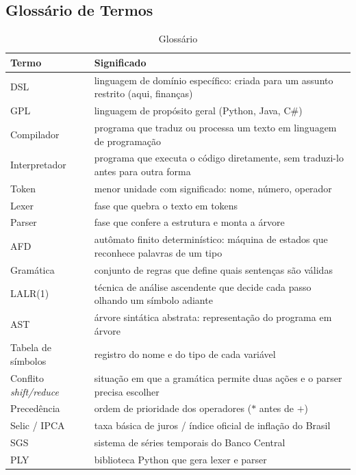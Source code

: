 \documentclass[conference]{IEEEtran}
\begin{document}
\subsection{Glossário de Termos}
\label{sec:glossario}

\begin{table}[!htbp]
\caption{Glossário}
\label{tab:glossario}
\centering
\footnotesize
\begin{tabular}{@{}p{}p{}@{}}
\toprule
\textbf{Termo} & \textbf{Significado} \\
\midrule
DSL & linguagem de domínio específico: criada para um assunto restrito (aqui, finanças) \\
GPL & linguagem de propósito geral (Python, Java, C\#) \\
Compilador & programa que traduz ou processa um texto em linguagem de programação \\
Interpretador & programa que executa o código diretamente, sem traduzi-lo antes para outra forma \\
Token & menor unidade com significado: nome, número, operador \\
Lexer & fase que quebra o texto em tokens \\
Parser & fase que confere a estrutura e monta a árvore \\
AFD & autômato finito determinístico: máquina de estados que reconhece palavras de um tipo \\
Gramática & conjunto de regras que define quais sentenças são válidas \\
LALR(1) & técnica de análise ascendente que decide cada passo olhando um símbolo adiante \\
AST & árvore sintática abstrata: representação do programa em árvore \\
Tabela de símbolos & registro do nome e do tipo de cada variável \\
Conflito \textit{shift/reduce} & situação em que a gramática permite duas ações e o parser precisa escolher \\
Precedência & ordem de prioridade dos operadores ($*$ antes de $+$) \\
Selic / IPCA & taxa básica de juros / índice oficial de inflação do Brasil \\
SGS & sistema de séries temporais do Banco Central \\
PLY & biblioteca Python que gera lexer e parser \\
\bottomrule
\end{tabular}
\end{table}
\end{document}
